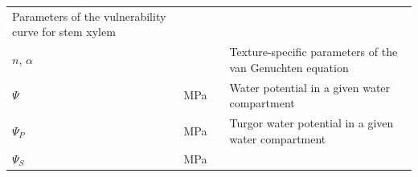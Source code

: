 \documentclass[]{book}
\begin{document}
\begin{longtable}[]{@{}llll@{}}
\begin{minipage}[t]{0.45\columnwidth}
Parameters of the vulnerability curve for stem xylem\strut
\end{minipage}\tabularnewline
\begin{minipage}[t]{0.11\columnwidth}\raggedright\strut
\(n\), \(\alpha\)\strut
\end{minipage} & \begin{minipage}[t]{0.10\columnwidth}\raggedright\strut
\strut
\end{minipage} & \begin{minipage}[t]{0.12\columnwidth}\raggedright\strut
\strut
\end{minipage} & \begin{minipage}[t]{0.45\columnwidth}\raggedright\strut
Texture-specific parameters of the van Genuchten equation\strut
\end{minipage}\tabularnewline
\begin{minipage}[t]{0.11\columnwidth}\raggedright\strut
\(\Psi\)\strut
\end{minipage} & \begin{minipage}[t]{0.10\columnwidth}\raggedright\strut
MPa\strut
\end{minipage} & \begin{minipage}[t]{0.12\columnwidth}\raggedright\strut
\strut
\end{minipage} & \begin{minipage}[t]{0.45\columnwidth}\raggedright\strut
Water potential in a given water compartment\strut
\end{minipage}\tabularnewline
\begin{minipage}[t]{0.11\columnwidth}\raggedright\strut
\(\Psi_P\)\strut
\end{minipage} & \begin{minipage}[t]{0.10\columnwidth}\raggedright\strut
MPa\strut
\end{minipage} & \begin{minipage}[t]{0.12\columnwidth}\raggedright\strut
\strut
\end{minipage} & \begin{minipage}[t]{0.45\columnwidth}\raggedright\strut
Turgor water potential in a given water compartment\strut
\end{minipage}\tabularnewline
\begin{minipage}[t]{0.11\columnwidth}\raggedright\strut
\(\Psi_S\)\strut
\end{minipage} & \begin{minipage}[t]{0.10\columnwidth}\raggedright\strut
MPa\strut
\end{minipage} & \begin{minipage}[t]{0.12\columnwidth}\raggedright\strut

\end{minipage}
\end{longtable}
\end{document}
